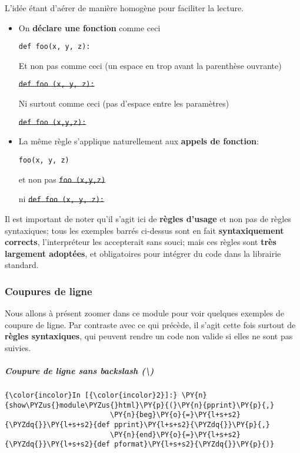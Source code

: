 L'idée étant d'aérer de manière homogène pour faciliter la lecture.

    \begin{itemize}
\item
  On \textbf{déclare une fonction} comme ceci

  \texttt{def\ foo(x,\ y,\ z):}

  Et non pas comme ceci (un espace en trop avant la parenthèse ouvrante)

  \sout{\texttt{def\ foo\ (x,\ y,\ z):}}

  Ni surtout comme ceci (pas d'espace entre les paramètres)

  \sout{\texttt{def\ foo\ (x,y,z):}}
\end{itemize}

    \begin{itemize}
\item
  La même règle s'applique naturellement aux \textbf{appels de
  fonction}:

  \texttt{foo(x,\ y,\ z)}

  et non pas \sout{\texttt{foo\ (x,y,z)}}

  ni \sout{\texttt{def\ foo\ (x,\ y,\ z):}}
\end{itemize}

    Il est important de noter qu'il s'agit ici de \textbf{règles d'usage} et
non pas de règles syntaxiques; tous les exemples barrés ci-dessus sont
en fait \textbf{syntaxiquement corrects}, l'interpréteur les accepterait
sans souci; mais ces règles sont \textbf{très largement adoptées}, et
obligatoires pour intégrer du code dans la librairie standard.

    \hypertarget{coupures-de-ligne}{%
\subsubsection{Coupures de ligne}\label{coupures-de-ligne}}

    Nous allons à présent zoomer dans ce module pour voir quelques exemples
de coupure de ligne. Par contraste avec ce qui précède, il s'agit cette
fois surtout de \textbf{règles syntaxiques}, qui peuvent rendre un code
non valide si elles ne sont pas suivies.

    \hypertarget{coupure-de-ligne-sans-backslash}{%
\subparagraph{\texorpdfstring{Coupure de ligne sans \emph{backslash}
(\textbackslash{})}{Coupure de ligne sans backslash (\textbackslash{})}}\label{coupure-de-ligne-sans-backslash}}

    \begin{Verbatim}[commandchars=\\\{\}]
{\color{incolor}In [{\color{incolor}2}]:} \PY{n}{show\PYZus{}module\PYZus{}html}\PY{p}{(}\PY{n}{pprint}\PY{p}{,} 
                         \PY{n}{beg}\PY{o}{=}\PY{l+s+s2}{\PYZdq{}}\PY{l+s+s2}{def pprint}\PY{l+s+s2}{\PYZdq{}}\PY{p}{,}
                         \PY{n}{end}\PY{o}{=}\PY{l+s+s2}{\PYZdq{}}\PY{l+s+s2}{def pformat}\PY{l+s+s2}{\PYZdq{}}\PY{p}{)}
\end{Verbatim}


